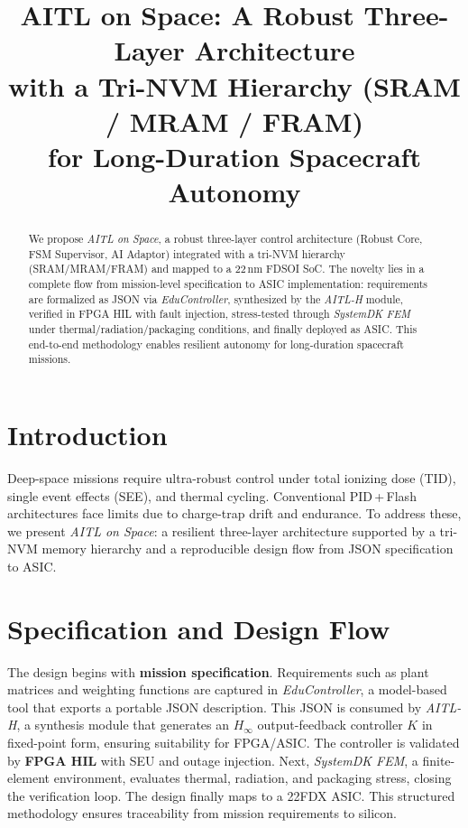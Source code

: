 \documentclass[conference]{IEEEtran}
\title{AITL on Space: A Robust Three-Layer Architecture\\
with a Tri-NVM Hierarchy (SRAM / MRAM / FRAM)\\
for Long-Duration Spacecraft Autonomy}
\author{
\IEEEauthorblockN{Shinichi Samizo}
\IEEEauthorblockA{Independent Semiconductor Researcher\\
Former Engineer at Seiko Epson Corporation\\
Email: shin3t72@gmail.com\quad GitHub: \url{https://github.com/Samizo-AITL}}
}
\begin{document}
\maketitle

\begin{abstract}
We propose \emph{AITL on Space}, a robust three-layer control architecture (Robust Core, FSM Supervisor, AI Adaptor) integrated with a tri-NVM hierarchy (SRAM/MRAM/FRAM) and mapped to a 22\,nm FD\!SOI SoC. The novelty lies in a complete flow from mission-level specification to ASIC implementation: requirements are formalized as JSON via \emph{EduController}, synthesized by the \emph{AITL-H} module, verified in FPGA HIL with fault injection, stress-tested through \emph{SystemDK FEM} under thermal/radiation/packaging conditions, and finally deployed as ASIC. This end-to-end methodology enables resilient autonomy for long-duration spacecraft missions.
\end{abstract}

\section{Introduction}
Deep-space missions require ultra-robust control under total ionizing dose (TID), single event effects (SEE), and thermal cycling. Conventional PID\,+\,Flash architectures face limits due to charge-trap drift and endurance. To address these, we present \emph{AITL on Space}: a resilient three-layer architecture supported by a tri-NVM memory hierarchy and a reproducible design flow from JSON specification to ASIC.

\section{Specification and Design Flow}
The design begins with \textbf{mission specification}. Requirements such as plant matrices and weighting functions are captured in \emph{EduController}, a model-based tool that exports a portable JSON description. This JSON is consumed by \emph{AITL-H}, a synthesis module that generates an $H_\infty$ output-feedback controller $K$ in fixed-point form, ensuring suitability for FPGA/ASIC.  
The controller is validated by \textbf{FPGA HIL} with SEU and outage injection. Next, \emph{SystemDK FEM}, a finite-element environment, evaluates thermal, radiation, and packaging stress, closing the verification loop. The design finally maps to a 22FDX ASIC. This structured methodology ensures traceability from mission requirements to silicon.
\end{document}
